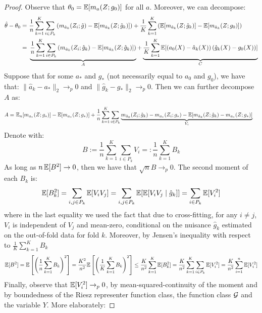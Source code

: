 \begin{proof}
Observe that $\theta_0 = \mathbb{E}[m_{a}(Z; g_0)]$ for all $a$. Moreover, we can decompose:
\begin{align}
    \hat{\theta}-\theta_0 =~& \frac{1}{n} \sum_{k=1}^K \sum_{i\in P_k} \left(m_{\hat{a}_k}(Z_i; \hat{g}) - \mathbb{E}[m_{\hat{a}_k}(Z; \hat{g}_k)]\right) + \frac{1}{K} \sum_{k=1}^K \left(\mathbb{E}[m_{\hat{a}_k}(Z; \hat{g}_k)] - \mathbb{E}[m_{\hat{a}_k}(Z; g_0)]\right)\\
    =~& \underbrace{\frac{1}{n} \sum_{k=1}^K \sum_{i\in P_k} \left(m_{\hat{a}_k}(Z_i; \hat{g}_k) - \mathbb{E}[m_{\hat{a}_k}(Z; \hat{g}_k)]\right)}_{A} + \underbrace{\frac{1}{K} \sum_{k=1}^K \mathbb{E}[(a_0(X) - \hat{a}_k(X))\, (\hat{g}_k(X) - g_0(X))]}_{C}
\end{align}
Suppose that for some $a_*$ and $g_*$ (not necessarily equal to $a_0$ and $g_0$), we have that: $\|\hat{a}_k-a_*\|_2 \to_p 0$ and $\|\hat{g}_k-g_*\|_2\to_p 0$. Then we can further decompose $A$ as:
\begin{align}
    A =~& \mathbb{E}_n[m_{a_*}(Z; g_*)] - \mathbb{E}[m_{a_*}(Z; g_*)] + \frac{1}{n} \sum_{k=1}^K \sum_{i\in P_k} \underbrace{m_{\hat{a}_k}(Z_i; \hat{g}_k) - m_{a_*}(Z_i; g_*) - \mathbb{E}[m_{\hat{a}_k}(Z; \hat{g}_k) - m_{a_*}(Z; g_*)]}_{V_i}
\end{align}
Denote with: 
\begin{equation}
    B := \frac{1}{n}\sum_{k=1}^K \sum_{i\in P_k} V_i =: \frac{1}{n} \sum_{k=1}^{K} B_k
\end{equation}
As long as $n\,\mathbb{E}[B^2]\to 0$, then we have that $\sqrt{n} B \to_p 0$. The second moment of each $B_k$ is:
\begin{equation}
    \mathbb{E}[B_k^2] = \sum_{i, j\in P_k} \mathbb{E}[V_i V_j] = \sum_{i, j\in P_k} \mathbb{E}[\mathbb{E}[V_i V_j \mid \hat{g}_k]] = \sum_{i\in P_k} \mathbb{E}[V_i^2] 
\end{equation}
where in the last equality we used the fact that due to cross-fitting, for any $i\neq j$, $V_i$ is independent of $V_j$ and mean-zero, conditional on the nuisance $\hat{g}_k$ estimated on the out-of-fold data for fold $k$. 
Moreover, by Jensen's inequality with respect to $\frac{1}{K}\sum_{k=1}^K B_k$
\begin{equation}
    \mathbb{E}[B^2] = \mathbb{E}\left[\left(\frac{1}{n} \sum_{k=1}^K B_k\right)^2\right] = \frac{K^2}{n^2} \mathbb{E}\left[\left(\frac{1}{K} \sum_{k=1}^K B_k\right)^2\right] \leq \frac{K}{n^2} \sum_{k=1}^K \mathbb{E}[B_k^2] = \frac{K}{n^2} \sum_{k=1}^K \sum_{i\in P_k} \mathbb{E}[V_i^2] = \frac{K}{n^2} \sum_{i=1}^n \mathbb{E}[V_i^2]
\end{equation}
Finally, observe that $\mathbb{E}[V_i^2] \to_p 0$, by mean-squared-continuity of the moment and by boundedness of the Riesz representer function class, the function class ${\mathcal G}$ and the variable $Y$. More elaborately:

\end{proof}
